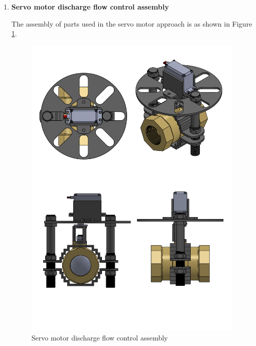 \begin{enumerate}
\begin{enumerate}
    \par
    \item \textbf{Servo motor discharge flow control assembly}
    \par
    The assembly of parts used in the servo motor approach is as shown in Figure \ref{fig:servo_motor_discharge flow control assembly}.
     \begin{figure}[H]
         \centering
         \includegraphics[height=.55\textheight]{Figures/ServoHolderBallValveAssembly.PNG}
         \caption{Servo motor discharge flow control assembly}
         \label{fig:servo_motor_discharge flow control assembly}
     \end{figure}
      

\end{enumerate}
\end{enumerate}
